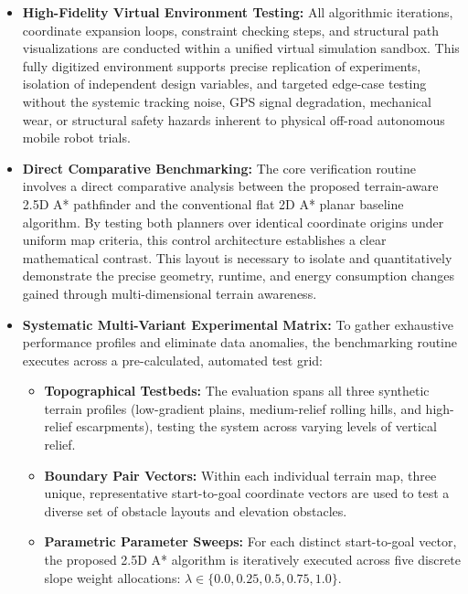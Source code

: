 \begin{itemize}
    \item \textbf{High-Fidelity Virtual Environment Testing:} All algorithmic iterations, coordinate expansion loops, constraint checking steps, and structural path visualizations are conducted within a unified virtual simulation sandbox. This fully digitized environment supports precise replication of experiments, isolation of independent design variables, and targeted edge-case testing without the systemic tracking noise, GPS signal degradation, mechanical wear, or structural safety hazards inherent to physical off-road autonomous mobile robot trials.

    \item \textbf{Direct Comparative Benchmarking:} The core verification routine involves a direct comparative analysis between the proposed terrain-aware 2.5D A* pathfinder and the conventional flat 2D A* planar baseline algorithm. By testing both planners over identical coordinate origins under uniform map criteria, this control architecture establishes a clear mathematical contrast. This layout is necessary to isolate and quantitatively demonstrate the precise geometry, runtime, and energy consumption changes gained through multi-dimensional terrain awareness.

    \item \textbf{Systematic Multi-Variant Experimental Matrix:} To gather exhaustive performance profiles and eliminate data anomalies, the benchmarking routine executes across a pre-calculated, automated test grid:
    \begin{itemize}
        \item \textbf{Topographical Testbeds:} The evaluation spans all three synthetic terrain profiles (low-gradient plains, medium-relief rolling hills, and high-relief escarpments), testing the system across varying levels of vertical relief.
        \item \textbf{Boundary Pair Vectors:} Within each individual terrain map, three unique, representative start-to-goal coordinate vectors are used to test a diverse set of obstacle layouts and elevation obstacles.
        \item \textbf{Parametric Parameter Sweeps:} For each distinct start-to-goal vector, the proposed 2.5D A* algorithm is iteratively executed across five discrete slope weight allocations: $\lambda \in \{0.0, \allowbreak 0.25, \allowbreak 0.5, \allowbreak 0.75, \allowbreak 1.0\}$.
    \end{itemize}
\end{itemize}

